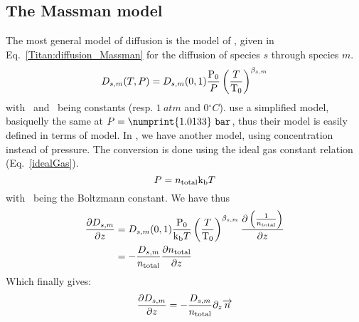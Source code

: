 \subsection{The Massman model}

The most general model of diffusion is the model of \citet{Massman1998}, given
in Eq.~\ref{Titan:diffusion_Massman} for the diffusion of species $s$ through
species $m$.
\begin{equation}
D_{s,m}(T,P) = D_{s,m}(0,1) \frac{\mathrm{P_0}}{P}\left(\frac{T}{\mathrm{T_0}}\right)^{\beta_{s,m}}
\label{Titan:diffusion_Massman}
\end{equation}
with \Pz\ and \Tz\ being constants (resp. $1~\unit{atm}$ and $0\unit{^\circ C}$).
\citet{Wakeham1973} use a simplified model, basiquelly the same at $P=\numprint{1.0133}~\unit{bar}$, thus
their model is easily defined in terms of \citet{Massman1998} model. In \citet{WilsonPhD,Haye2005},
we have another model, using concentration instead of pressure. The conversion is done
using the ideal gas constant relation (Eq.~\ref{idealGas}).
\begin{equation}
P = n_\text{total}\text{k}_\text{b} T
\label{idealGas}
\end{equation}
with \kb\ being the Boltzmann constant.
We have thus
\begin{equation}
\begin{split}
\frac{\partial D_{s,m}}{\partial z} & = D_{s,m}(0,1) \frac{\mathrm{P_0}}{\text{k}_\text{b} T}\left(\frac{T}{\mathrm{T_0}}\right)^{\beta_{s,m}} \frac{\partial\left(\frac{1}{n_\text{total}}\right)}{\partial z}\\
                      & = -\frac{D_{s,m}}{n_\text{total}}\frac{\partial n_\text{total}}{\partial z}
\end{split}
\end{equation}
Which finally gives:
\begin{equation}
\frac{\partial D_{s,m}}{\partial z}  = -\frac{D_{s,m}}{n_\text{total}}\partial_{z}{\overrightarrow{n}}
\label{Titan:Massman_derive}
\end{equation}

